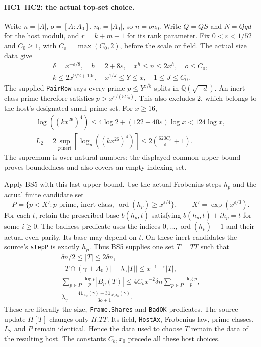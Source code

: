 \documentclass[11pt,a4paper]{article}
\numberwithin{equation}{section}
\theoremstyle{remark}\newtheorem{remark}[theorem]{Remark}
\begin{document}
\paragraph{HC1--HC2: the actual top-set choice.}
Write $n=|A|$, $o=[A:A_0]$, $n_0=|A_0|$, so $n=on_0$.
Write $Q=QS$ and $N=Qqd$ for the host moduli, and
$r=k+m-1$ for its rank parameter.
Fix $0<\varepsilon<1/52$ and $C_0\ge1$, with
$C_o=\max(C_0,2)$, before the scale or field. The actual size data give
\[
 \begin{gathered}
 \delta=x^{-\varepsilon/8},\quad h=2+8\varepsilon,
 \quad x^h\le n\le2x^h,\quad o\le C_0,\\
 k\le2x^{9/2+10\varepsilon},\quad
 x^{1/J}\le Y\le x,\quad 1\le J\le C_0.
 \end{gathered}                                      \tag{HC.1}
\]
The supplied \texttt{PairRow} says every prime
$p\le Y^{\varepsilon/5}$ splits in $\mathbb Q(\sqrt{-d})$.
An inert-class prime therefore satisfies
$p>x^{\varepsilon/(5C_o)}$. This also excludes $2$, which belongs
to the host's designated small-prime set. For $x\ge16$,
\[
 \begin{gathered}
 \log((kx^{26})^4)
 \le4\log2+(122+40\varepsilon)\log x<124\log x,\\
 L_2=2\sup_{p\,\mathrm{inert}}
       \left\lceil\log_p((kx^{26})^4)\right\rceil
 \le2\left(\frac{620C_o}{\varepsilon}+1\right).
 \end{gathered}                                      \tag{HC.2}
\]
The supremum is over natural numbers; the displayed common upper
bound proves boundedness and also covers an empty indexing set.

Apply BS5 with this last upper bound. Use the actual Frobenius steps
$h_p$ and the actual finite candidate set
\[
 P=\{p<X':p\text{ prime, inert-class},\
             \operatorname{ord}(h_p)\ge x^{\varepsilon/4}\},
 \qquad X'=\exp(x^{\varepsilon/3}).
\]
For each $t$, retain the prescribed base $b(h_p,t)$ satisfying
$b(h_p,t)+ih_p=t$ for some $i\ge0$. The badness predicate uses
the indices $0,\ldots,\operatorname{ord}(h_p)-1$ and their actual
even parity. Its base may depend on $t$. On these inert candidates
the source's \texttt{stepP} is exactly $h_p$. Thus BS5 supplies one
set $T=TT$ such that
\[
 \begin{gathered}
 \delta n/2\le |T|\le2\delta n,\\
 \bigl||T\cap(\gamma+A_0)|-\lambda_\gamma|T|\bigr|
       \le x^{-1+\varepsilon}|T|,\\
 \sum_{p\in P}\frac{\log p}{p}|B_p(T)|
       \le4C_bx^{-2}\delta n\sum_{p\in P}\frac{\log p}{p},\\
 \lambda_\gamma=
 \frac{4\mathbf1_{A_0}(\gamma)+3\mathbf1_{A\setminus A_0}(\gamma)}{3o+1}.
 \end{gathered}                                      \tag{HC.3}
\]
These are literally the size, \texttt{Frame.Shares} and
\texttt{BadOK} predicates. The source update $H[T]$ changes only
$H.TT$. Its field, \texttt{HostAx}, Frobenius law, prime classes,
$L_2$ and $P$ remain identical. Hence the data used to choose $T$
remain the data of the resulting host. The constants $C_b,x_0$
precede all these host choices.
\end{document}
